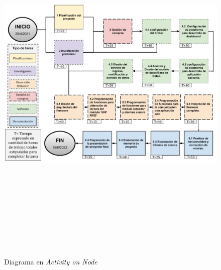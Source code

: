 \documentclass[
11pt, %
codirector, %
]{charter}
\begin{document}
\begin{figure}[htpb]
\centering 
\includegraphics[width=16cm, height=18cm]{./Figuras/DAoN.jpg}
\caption{Diagrama en \textit{Activity on Node}}
\label{fig:AoN}
\end{figure}
\end{document}
